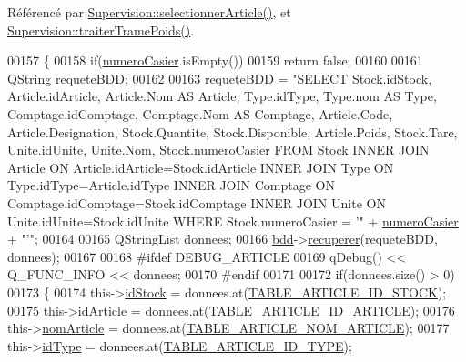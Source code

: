 Référencé par \hyperlink{_supervision_8cpp_source_l00320}{Supervision\+::selectionner\+Article()}, et \hyperlink{_supervision_8cpp_source_l00370}{Supervision\+::traiter\+Trame\+Poids()}.


\begin{DoxyCode}
00157 \{
00158     \textcolor{keywordflow}{if}(\hyperlink{class_article_a4b8dd9598cc16200c60c7f55196fc26d}{numeroCasier}.isEmpty())
00159         \textcolor{keywordflow}{return} \textcolor{keyword}{false};
00160 
00161     QString requeteBDD;
00162 
00163     requeteBDD = \textcolor{stringliteral}{"SELECT Stock.idStock, Article.idArticle, Article.Nom AS Article, Type.idType, Type.nom AS
       Type, Comptage.idComptage, Comptage.Nom AS Comptage, Article.Code, Article.Designation, Stock.Quantite,
       Stock.Disponible, Article.Poids, Stock.Tare, Unite.idUnite, Unite.Nom, Stock.numeroCasier FROM Stock INNER JOIN
       Article ON Article.idArticle=Stock.idArticle INNER JOIN Type ON Type.idType=Article.idType INNER JOIN
       Comptage ON Comptage.idComptage=Stock.idComptage INNER JOIN Unite ON Unite.idUnite=Stock.idUnite WHERE
       Stock.numeroCasier = '"} + \hyperlink{class_article_a4b8dd9598cc16200c60c7f55196fc26d}{numeroCasier} + \textcolor{stringliteral}{"'"};
00164 
00165     QStringList donnees;
00166     \hyperlink{class_article_a7221cec4212d86d74f479b9ee683ee8a}{bdd}->\hyperlink{class_bdd_a8f25d29d309041bbf875700db0efd97b}{recuperer}(requeteBDD, donnees);
00167 
00168 \textcolor{preprocessor}{    #ifdef DEBUG\_ARTICLE}
00169         qDebug() << Q\_FUNC\_INFO << donnees;
00170 \textcolor{preprocessor}{    #endif}
00171 
00172     \textcolor{keywordflow}{if}(donnees.size() > 0)
00173     \{
00174         this->\hyperlink{class_article_afb7785930598d5fbdafb707acdd3eec1}{idStock} = donnees.at(\hyperlink{_article_8h_a159354683cfd6e1b578172fbe6490ab6acfb8962aaa35363f43d27a9f6f1ae265}{TABLE\_ARTICLE\_ID\_STOCK});
00175         this->\hyperlink{class_article_a9f2f7a04139f26accec145066a5aacae}{idArticle} = donnees.at(\hyperlink{_article_8h_a159354683cfd6e1b578172fbe6490ab6a9282e68cff8aecde470ad5004f0e5ebb}{TABLE\_ARTICLE\_ID\_ARTICLE});
00176         this->\hyperlink{class_article_a0ba6c08f7dd54e4b7caf673ecd6b41a6}{nomArticle} = donnees.at(\hyperlink{_article_8h_a159354683cfd6e1b578172fbe6490ab6a7a309a358c54f9ea482a222d0cb4d135}{TABLE\_ARTICLE\_NOM\_ARTICLE});
00177         this->\hyperlink{class_article_a1586203d0eb334a3298ca719f924083d}{idType} = donnees.at(\hyperlink{_article_8h_a159354683cfd6e1b578172fbe6490ab6a57d25aaddbe360d849497b01b865599c}{TABLE\_ARTICLE\_ID\_TYPE});

\end{DoxyCode}
